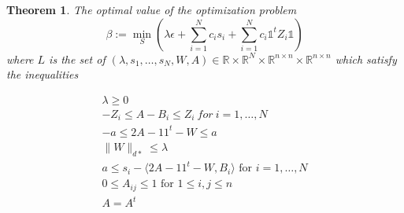 \documentclass[12pt]{amsart}
\newtheorem{theorem}[lemma]{Theorem}
\numberwithin{equation}{section}
\newcommand{\RR}{\mathbb{R}}
\begin{document}
\begin{theorem} 
The optimal value of the optimization problem
\[\beta:=\min_S \left(\lambda\epsilon +\sum_{i=1}^N c_is_i+\sum_{i=1}^Nc_i\mathds{1}^tZ_i\mathds{1}\right)\]
where $L$ is the set of $(\lambda, s_1,\dots, s_N, W,A)\in \RR\times\RR^N\times \RR^{n\times n}\times \RR^{n\times n}$ which satisfy the inequalities
\begin{center}
\[
\begin{array}{l}
\lambda \geq 0\\
-Z_i \leq A-B_i \leq Z_i \ for \ i=1,\dots, N \\
-a \leq 2A-11^t-W \leq a \\
\|W\|_{d*}\leq \lambda\\
a\leq s_i-\langle 2A-11^t-W, B_i\rangle\text{ for $i=1,\dots, N$}\\
0\leq A_{ij}\leq 1 \text{ for  $1\leq i,j\leq n$} \\
A = A^t
\end{array}
\]

\end{center}


\end{theorem}
\end{document}
